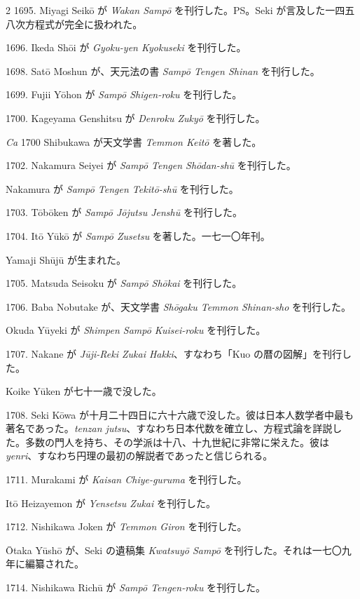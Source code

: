 \documentclass[11pt]{article}
\newcommand{\scanpage}[2]{\clearpage\setcounter{footnote}{0}\noindent{\footnotesize\color{gray}PDF #1 頁 · #2}\par\medskip}
\begin{document}
\scanpage{0196}{第23章年表、印刷頁182}
\begin{multicols}{2}\small
1695. Miyagi Seikō が \emph{Wakan Sampō} を刊行した。PS。Seki が言及した一四五八次方程式が完全に扱われた。

1696. Ikeda Shōi が \emph{Gyoku-yen Kyokuseki} を刊行した。

1698. Satō Moshun が、天元法の書 \emph{Sampō Tengen Shinan} を刊行した。

1699. Fujii Yōhon が \emph{Sampō Shigen-roku} を刊行した。

1700. Kageyama Genshitsu が \emph{Denroku Zukyō} を刊行した。

\emph{Ca} 1700 Shibukawa が天文学書 \emph{Temmon Keitō} を著した。

1702. Nakamura Seiyei が \emph{Sampō Tengen Shōdan-shū} を刊行した。

Nakamura が \emph{Sampō Tengen Tekitō-shū} を刊行した。

1703. Tōbōken が \emph{Sampō Jōjutsu Jenshū} を刊行した。

1704. Itō Yūkō が \emph{Sampō Zusetsu} を著した。一七一〇年刊。

Yamaji Shūjū が生まれた。

1705. Matsuda Seisoku が \emph{Sampō Shōkai} を刊行した。

1706. Baba Nobutake が、天文学書 \emph{Shōgaku Temmon Shinan-sho} を刊行した。

Okuda Yūyeki が \emph{Shimpen Sampō Kuisei-roku} を刊行した。

1707. Nakane が \emph{Jūji-Reki Zukai Hakki}、すなわち「Kuo の暦の図解」を刊行した。

Koike Yūken が七十一歳で没した。

1708. Seki Kōwa が十月二十四日に六十六歳で没した。彼は日本人数学者中最も著名であった。\emph{tenzan jutsu}、すなわち日本代数を確立し、方程式論を詳説した。多数の門人を持ち、その学派は十八、十九世紀に非常に栄えた。彼は \emph{yenri}、すなわち円理の最初の解説者であったと信じられる。

1711. Murakami が \emph{Kaisan Chiye-guruma} を刊行した。

Itō Heizayemon が \emph{Yensetsu Zukai} を刊行した。

1712. Nishikawa Joken が \emph{Temmon Giron} を刊行した。

\columnbreak
Ōtaka Yūshō が、Seki の遺稿集 \emph{Kwatsuyō Sampō} を刊行した。それは一七〇九年に編纂された。

1714. Nishikawa Richū が \emph{Sampō Tengen-roku} を刊行した。


\end{multicols}
\end{document}
